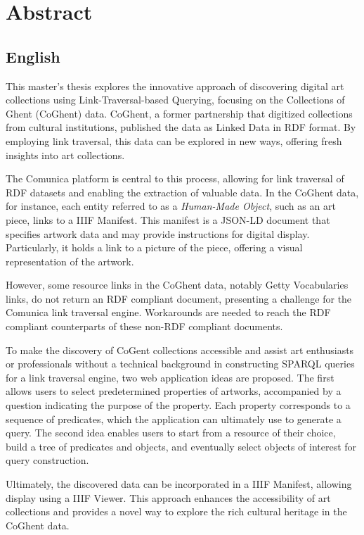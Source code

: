 \chapter*{Abstract}

\section*{English}

This master's thesis explores the innovative approach of discovering digital art collections using Link-Traversal-based Querying, focusing on the Collections of Ghent (CoGhent) data. CoGhent, a former partnership that digitized collections from cultural institutions, published the data as Linked Data in RDF format. By employing link traversal, this data can be explored in new ways, offering fresh insights into art collections.

The Comunica platform is central to this process, allowing for link traversal of RDF datasets and enabling the extraction of valuable data. In the CoGhent data, for instance, each entity referred to as a \textit{Human-Made Object}, such as an art piece, links to a IIIF Manifest. This manifest is a JSON-LD document that specifies artwork data and may provide instructions for digital display. Particularly, it holds a link to a picture of the piece, offering a visual representation of the artwork.

However, some resource links in the CoGhent data, notably Getty Vocabularies links, do not return an RDF compliant document, presenting a challenge for the Comunica link traversal engine. Workarounds are needed to reach the RDF compliant counterparts of these non-RDF compliant documents.

To make the discovery of CoGent collections accessible and assist art enthusiasts or professionals without a technical background in constructing SPARQL queries for a link traversal engine, two web application ideas are proposed. The first allows users to select predetermined properties of artworks, accompanied by a question indicating the purpose of the property. Each property corresponds to a sequence of predicates, which the application can ultimately use to generate a query. The second idea enables users to start from a resource of their choice, build a tree of predicates and objects, and eventually select objects of interest for query construction.

Ultimately, the discovered data can be incorporated in a IIIF Manifest, allowing display using a IIIF Viewer. This approach enhances the accessibility of art collections and provides a novel way to explore the rich cultural heritage in the CoGhent data.


